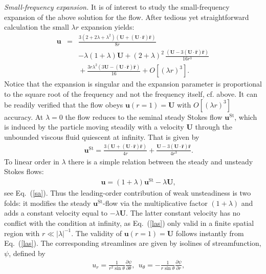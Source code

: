 \documentclass[aps,prx,twocolumn,amsmath,amssymb,amsfonts]{revtex4-2}
\begin{document}
{\textit{Small-frequency expansion.}
It is of interest to study the small-frequency expansion of the above solution for the flow. After tedious yet straightforward calculation the small $\lambda r$ expansion yields:
\begin{eqnarray}
\bm u\! &=& \!\frac{3(2\!+\!2\lambda\!+\!\lambda^2)\left(\bm U\!+\!(\bm U\!\cdot\! \bm{\hat r})\bm{\hat r}\right)}{8r}
\nonumber \\
&&-\lambda(1\!+\!\lambda)\bm U\!+\! (2\!+\!\lambda)^2\, \frac{(\bm U\!-\!3(\bm U\!\cdot\! \bm {\hat r})\bm {\hat r})}{16r^3} \nonumber \\
&& \!+\!  \frac{3 r\lambda^2(3 \bm U\!-\!(\bm U\!\cdot\! \bm {\hat r})\bm {\hat r})}{16}\!+\!O\left[(\lambda r)^3\right]. \label{sa}
\end{eqnarray}
Notice that the expansion is singular and the expansion parameter is proportional to the square root of the frequency and not the frequency itself, cf. above. It can be readily verified that the flow obeys $\bm u(r\!=\!1)=\bm U$ with $O\left[(\lambda r)^3\right]$ accuracy. At $\lambda\!=\!0$ the flow reduces to the seminal steady Stokes flow $\bm u^\mathrm{St}$, which is induced by the particle moving steadily with a velocity $\bm U$ through the unbounded viscous fluid quiescent at infinity. That is given by \cite{kim,hb,LL,Lamb}
\begin{eqnarray}&&
\bm u^\mathrm{St}\!=
\!\frac{3\left(\bm U\!+\!(\bm U\!\cdot\! \bm{\hat r})\bm{\hat r}\right)}{4r}+\frac{\bm U\!-\!3(\bm U\!\cdot\! \bm {\hat r})\bm {\hat r}}{4r^3}.
\end{eqnarray}
To linear order in $\lambda$ there is a simple relation between the steady and unsteady Stokes flows:
\begin{eqnarray}&&
\bm u\!=(1\!+\!\lambda)\bm u^\mathrm{St}-\lambda\bm U, \label{las}
\end{eqnarray}
see Eq.~(\ref{sa}). Thus the leading-order contribution of weak unsteadiness is two folds: it modifies the steady $\bm u^\mathrm{St}$-flow via the multiplicative factor $(1+\lambda)$ and adds a constant velocity equal to $-\lambda \bm U$. The latter constant velocity has no conflict with the condition at infinity, as Eq.~(\ref{las}) only valid in a finite spatial region with $r\ll |\lambda|^{-1}$. The validity of $\bm u(r=1)=\bm U$ follows instantly from Eq.~(\ref{las}). The corresponding streamlines are given by isolines of streamfunction, $\psi$, defined by
\begin{eqnarray}&&
u_r=\frac{1}{r^2\sin\theta}\frac{\partial \psi}{\partial\theta},\ \ u_{\theta}=-\frac{1}{r\sin\theta}\frac{\partial \psi}{\partial r},

\end{eqnarray}}
\end{document}
